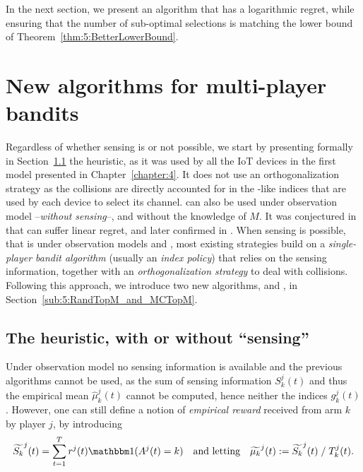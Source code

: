 In the next section, we present an algorithm that has a logarithmic regret,
while ensuring that the number of sub-optimal selections is matching the lower bound of Theorem~\ref{thm:5:BetterLowerBound}.



\section{New algorithms for multi-player bandits}
\label{sec:5:algorithms}


Regardless of whether sensing is or not possible, we start by presenting formally in Section~\ref{sub:5:Selfish} the \Selfish{} heuristic, as it was used by all the IoT devices in the first model presented in Chapter~\ref{chapter:4}.
It does not use an orthogonalization strategy as the collisions are directly accounted for in the \UCB-like indices that are used by each device to select its channel.
\Selfish{} can also be used under observation model \modeltrois{} --\emph{without sensing}--, and without the knowledge of $M$.
It was conjectured in \cite{Besson2018ALT} that \Selfish{} can suffer linear regret, and later confirmed in \cite{LugosiMehrabian18,BoursierPerchet18}.
%
When sensing is possible, that is under observation models \modelun{} and \modeldeux, most existing strategies build on a \emph{single-player bandit algorithm} (usually an \emph{index policy}) that relies on the sensing information, together with an \emph{orthogonalization strategy} to deal with collisions.
Following this approach, we introduce two new algorithms, \RandTopM{} and \MCTopM, in Section~\ref{sub:5:RandTopM_and_MCTopM}.


\subsection{The \Selfish{} heuristic, with or without ``sensing''}
\label{sub:5:Selfish}

Under observation model \modeltrois{} no sensing information is available and the previous algorithms cannot be used, as the sum of sensing information $S_k^j(t)$ and thus the empirical mean $\widehat{\mu}_k^j(t)$ cannot be computed, hence neither the indices $g_k^j(t)$. However, one can still define a notion of \emph{empirical reward} received from arm $k$ by player $j$, by introducing
%
\vspace*{-5pt}
\begin{equation}
  \widetilde{S_k}^j(t) = \sum_{t=1}^T r^j(t) \indic(A^j(t) = k)
  \ \ \ \text{and letting} \ \ \ \widetilde{\mu_k}^j(t) := \widetilde{S_k}^j(t) \;/\; T_k^j(t).
\end{equation}

